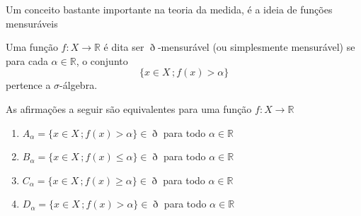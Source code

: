 \documentclass[a4paper, 11pt]{book}
\theoremstyle{definition}
\newcommand{\bR}{\mathbb{R}}
\newcommand{\cB}{\mathfrak{B}}
\begin{document}
\begin{prf}

\end{prf}

Um conceito bastante importante na teoria da medida, é a ideia de funções mensuráveis

\begin{dbox}
    Uma função $f : X \to \mathbb R$ é dita ser $\eth$-mensurável (ou simplesmente mensurável) se para cada $\alpha \in \mathbb{R}$, o conjunto
    \[
        \{x \in X \,; f(x) > \alpha\}
    \]
    pertence a $\sigma$-álgebra.
\end{dbox}

\begin{lbox}
    As afirmações a seguir são equivalentes para uma função $f : X \to \bR$
    \begin{enumerate}[leftmargin=*, label=\textbf{(\alph*)}]
        \item $A_\alpha = \{x \in X \,; f(x) > \alpha\} \in \eth$ para todo $\alpha \in \bR$
        \item $B_\alpha = \{x \in X \,; f(x) \leqslant \alpha\} \in \eth$ para todo $\alpha \in \bR$
        \item $C_\alpha = \{x \in X \,; f(x) \geqslant \alpha\} \in \eth$ para todo $\alpha \in \bR$
        \item $D_\alpha = \{x \in X \,; f(x) > \alpha\} \in \eth$ para todo $\alpha \in \bR$
    \end{enumerate}
\end{lbox}
\begin{prf}
    ~
\end{prf}
\end{document}
